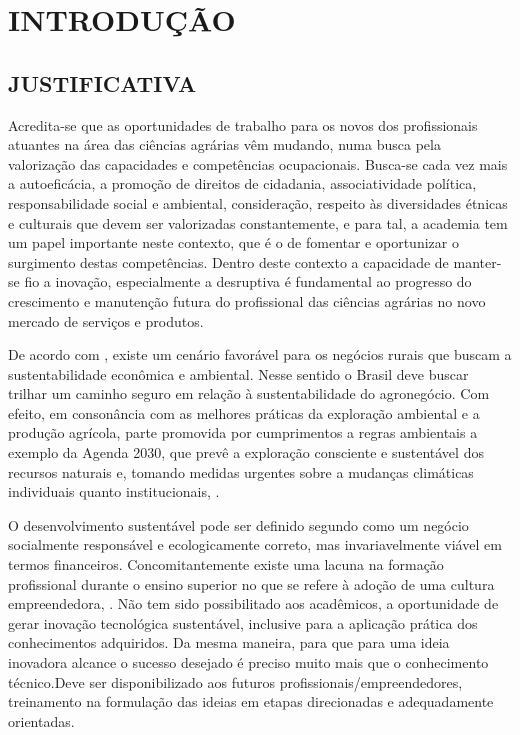\chapter{INTRODUÇÃO}

\section{JUSTIFICATIVA}

Acredita-se que as oportunidades de trabalho para os novos dos profissionais atuantes na área das ciências agrárias vêm mudando, numa busca pela valorização das capacidades e competências ocupacionais. Busca-se cada vez mais a autoeficácia, a promoção de direitos de cidadania, associatividade política, responsabilidade social e ambiental, consideração, respeito às diversidades étnicas e culturais que devem ser valorizadas constantemente, e para tal, a academia tem um papel importante neste contexto, que é o de fomentar e oportunizar o surgimento destas competências. Dentro deste contexto a capacidade de manter-se fio a inovação, especialmente a desruptiva é fundamental ao progresso do crescimento e manutenção futura do profissional das ciências agrárias no novo mercado de serviços e produtos. 

De acordo com , existe um cenário favorável para os negócios rurais que buscam a sustentabilidade econômica e ambiental. Nesse sentido o Brasil deve buscar trilhar um caminho seguro em relação à sustentabilidade do agronegócio. Com efeito, em consonância com as melhores práticas da exploração ambiental e a produção agrícola, parte promovida por cumprimentos a regras ambientais a exemplo da Agenda 2030, que prevê a exploração consciente e sustentável dos recursos naturais e, tomando medidas urgentes sobre a mudanças climáticas individuais quanto institucionais, \cite{filho_documentos_2017}.

O desenvolvimento sustentável pode ser definido segundo \cite{lara_ideologia_2017} como um negócio socialmente responsável e ecologicamente correto, mas invariavelmente viável em termos financeiros. Concomitantemente existe uma lacuna na formação profissional durante o ensino superior no que se refere à adoção de uma cultura empreendedora, \cite{lima_ser_2015}. Não tem sido possibilitado aos acadêmicos, a oportunidade de gerar inovação tecnológica sustentável, inclusive para a aplicação prática dos conhecimentos adquiridos. Da mesma maneira, para que para uma ideia inovadora alcance o sucesso desejado é preciso muito mais que o conhecimento técnico.Deve ser disponibilizado aos futuros profissionais/empreendedores, treinamento na formulação das ideias em etapas direcionadas e adequadamente orientadas.


